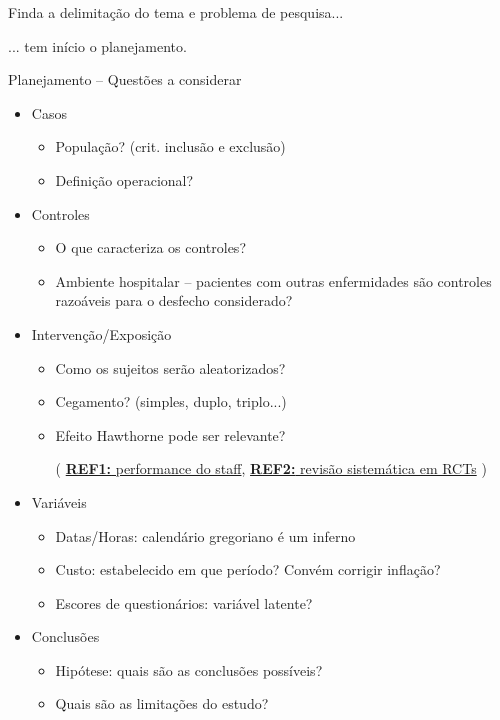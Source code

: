 \documentclass{beamer}
\begin{document}
\begin{frame}{}
  \begin{block}{}
    \centering
    \footnotesize
    Finda a delimitação do tema e problema de pesquisa...

    \bigskip
    \normalsize
    ... tem início o planejamento.
  \end{block}
\end{frame}

\begin{frame}{Planejamento -- Questões a considerar}
  \begin{itemize}
    \footnotesize
  \item<1,2> Casos
    \begin{itemize}
      \scriptsize
    \item<2> População? (crit. inclusão e exclusão)
    \item<2> Definição operacional?
    \end{itemize}
  \item<1,3> Controles
    \scriptsize
    \begin{itemize}
      \scriptsize
    \item<3> O que caracteriza os controles?
    \item<3> Ambiente hospitalar -- pacientes com outras enfermidades são controles razoáveis para o desfecho considerado?
    \end{itemize}
  \item<1,4> Intervenção/Exposição
    \begin{itemize}
      \scriptsize
    \item<4> Como os sujeitos serão aleatorizados?
    \item<4> Cegamento? (simples, duplo, triplo...)
    \item<4> Efeito Hawthorne pode ser relevante?

      ({\tiny
        \href{https://doi.org/10.1001/jamainternmed.2016.9685}
        {{\bf REF1:} performance do staff},
        \href{https://doi.org/10.1016/j.jclinepi.2013.08.015}
        {{\bf REF2:} revisão sistemática em RCTs}
      })
    \end{itemize}
  \item<1,5> Variáveis
    \begin{itemize}
      \scriptsize
    \item<5> Datas/Horas: calendário gregoriano é um inferno
    \item<5> Custo: estabelecido em que período? Convém corrigir inflação?
    \item<5> Escores de questionários: variável latente?
    \end{itemize}
  \item<1,6> Conclusões
    \begin{itemize}
      \scriptsize
    \item<6> Hipótese: quais são as conclusões possíveis?
    \item<6> Quais são as limitações do estudo?
    \end{itemize}
  \end{itemize}
\end{frame}
\end{document}
